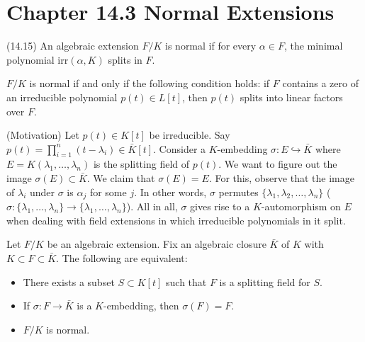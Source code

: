 \section{Chapter 14.3 Normal Extensions}
\begin{defi}
(14.15) An algebraic extension $F/K$ is normal if for every $\alpha \in F$, the minimal polynomial $\mathrm{irr}(\alpha ,K)$ splits in $F$.
\end{defi}
\vspace{2ex}
\begin{rmk}
$F/K$ is normal if and only if the following condition holds: if $F$ contains a zero of an irreducible polynomial $p(t)\in L[t]$, then $p(t)$ splits into linear factors over $F$. 
\end{rmk}
\vspace{2ex}
\begin{rmk}
(Motivation) Let $p(t)\in K[t]$ be irreducible. Say $p(t)=\prod _{i=1}^{n}(t-\lambda _{i})\in \bar{K}[t]$. Consider a $K$-embedding $\sigma :E\hookrightarrow \bar{K}$ where $E=K(\lambda_1,\ldots ,\lambda _{n})$ is the splitting field of $p(t)$. We want to figure out the image $\sigma (E)\subset \bar{K}$. We claim that $\sigma (E)=E$. For this, observe that the image of $\lambda _{i}$ under $\sigma $ is $\alpha _{j}$ for some $j$. In other words, $\sigma $ permutes $\{\lambda_1,\lambda_2,\ldots ,\lambda_{n}\}$ ($\sigma :\{\lambda _{1},\ldots ,\lambda _{n}\}\rightarrow \{\lambda_1,\ldots ,\lambda _{n}\}$). All in all, $\sigma $ gives rise to a $K$-automorphism on $E$ when dealing with field extensions in which irreducible polynomials in it split.
\end{rmk}
\vspace{2ex}
\begin{thm}
Let $F/K$ be an algebraic extension. Fix an algebraic closure $\bar{K}$ of $K$ with $K\subset F\subset \bar{K}$. The following are equivalent:
\begin{itemize}
\item[(i)] There exists a subset $S\subset K[t]$ such that $F$ is a splitting field for $S$.
\item[(ii)] If $\sigma :F\rightarrow \bar{K}$ is a $K$-embedding, then $\sigma (F)=F$.
\item[(iii)] $F/K$ is normal.
\end{itemize}
\end{thm}
\vspace{2ex}
